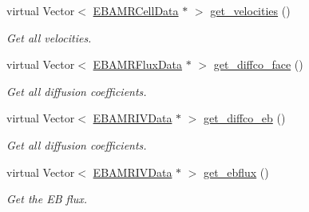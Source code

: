\begin{DoxyCompactItemize}
virtual Vector$<$ \hyperlink{type__definitions_8H_a7e610f301989e5e07781c5e338bdb7c3}{E\+B\+A\+M\+R\+Cell\+Data} $\ast$ $>$ \hyperlink{classcdr__layout_acf15aefa0bac3c9399ba93c37af00b89}{get\+\_\+velocities} ()
\begin{DoxyCompactList}\small\item\em Get all velocities. \end{DoxyCompactList}\item 
virtual Vector$<$ \hyperlink{type__definitions_8H_aadad278b2e5d3d4abcf9032f90ba78c3}{E\+B\+A\+M\+R\+Flux\+Data} $\ast$ $>$ \hyperlink{classcdr__layout_a1f1c25c1a12c0f9bd53f49cbd8cda156}{get\+\_\+diffco\+\_\+face} ()
\begin{DoxyCompactList}\small\item\em Get all diffusion coefficients. \end{DoxyCompactList}\item 
virtual Vector$<$ \hyperlink{type__definitions_8H_a6b8fa905d55cbb491b52180386f0e0c1}{E\+B\+A\+M\+R\+I\+V\+Data} $\ast$ $>$ \hyperlink{classcdr__layout_a063277f482a22189d6e6f2bbc9b026c2}{get\+\_\+diffco\+\_\+eb} ()
\begin{DoxyCompactList}\small\item\em Get all diffusion coefficients. \end{DoxyCompactList}\item 
virtual Vector$<$ \hyperlink{type__definitions_8H_a6b8fa905d55cbb491b52180386f0e0c1}{E\+B\+A\+M\+R\+I\+V\+Data} $\ast$ $>$ \hyperlink{classcdr__layout_a6043bc021cd35d0f912fa8953cd51c6b}{get\+\_\+ebflux} ()
\begin{DoxyCompactList}\small\item\em Get the EB flux. \end{DoxyCompactList}\end{DoxyCompactItemize}
